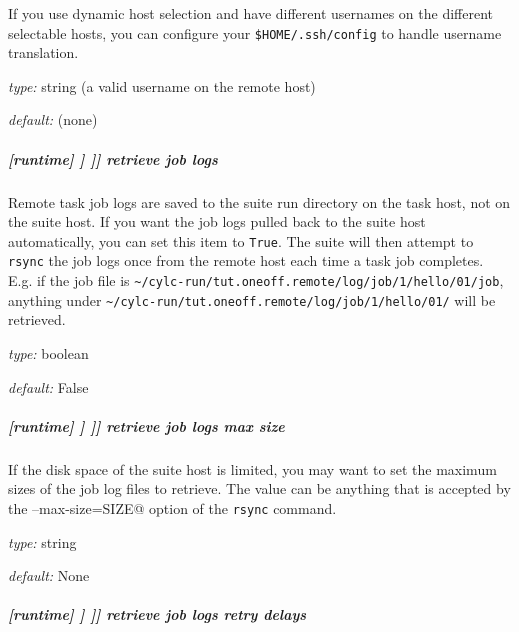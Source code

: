 If you use dynamic host selection and have different usernames on
the different selectable hosts, you can configure your
\lstinline=$HOME/.ssh/config= to handle username translation.

\begin{myitemize}
\item {\em type:} string (a valid username on the remote host)
\item {\em default:} (none)
\end{myitemize}

\subparagraph[retrieve job logs]{[runtime] \textrightarrow [[\_\_NAME\_\_]] \textrightarrow [[[remote]]] \textrightarrow retrieve job logs}
\label{runtime-remote-retrieve-job-logs}

Remote task job logs are saved to the suite run directory on the task host, not
on the suite host. If you want the job logs pulled back to the suite host
automatically, you can set this item to \lstinline=True=. The suite will
then attempt to \lstinline=rsync= the job logs once from the remote host each
time a task job completes. E.g. if the job file is
\lstinline=~/cylc-run/tut.oneoff.remote/log/job/1/hello/01/job=, anything under
\lstinline=~/cylc-run/tut.oneoff.remote/log/job/1/hello/01/= will be retrieved.

\begin{myitemize}
\item {\em type:} boolean
\item {\em default:} False
\end{myitemize}

\subparagraph[retrieve job logs max size]{[runtime] \textrightarrow [[\_\_NAME\_\_]] \textrightarrow [[[remote]]] \textrightarrow retrieve job logs max size}
\label{runtime-remote-retrieve-job-logs-max-size}

If the disk space of the suite host is limited, you may want to set the maximum
sizes of the job log files to retrieve. The value can be anything that is
accepted by the \lstinline@--max-size=SIZE@ option of the \lstinline=rsync=
command.

\begin{myitemize}
\item {\em type:} string
\item {\em default:} None
\end{myitemize}

\subparagraph[retrieve job logs retry delays]{[runtime] \textrightarrow [[\_\_NAME\_\_]] \textrightarrow [[[remote]]] \textrightarrow retrieve job logs retry delays}
\label{runtime-remote-retrieve-job-logs-retry-delays}

